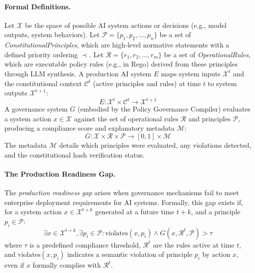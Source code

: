 \documentclass[manuscript,screen,9pt]{acmart}
\begin{document}
\begin{table}[!htb]
\paragraph{Formal Definitions.} Let $\mathcal{X}$ be the space of possible AI system actions or decisions (e.g., model outputs, system behaviors). Let $\mathcal{P} = \{p_1, p_2, \ldots, p_n\}$ be a set of \textit{ConstitutionalPrinciples}, which are high-level normative statements with a defined priority ordering $\prec$. Let $\mathcal{R} = \{r_1, r_2, \ldots, r_m\}$ be a set of \textit{OperationalRules}, which are executable policy rules (e.g., in Rego) derived from these principles through LLM synthesis. A production AI system $E$ maps system inputs $\mathcal{X}^t$ and the constitutional context $\mathcal{C}^t$ (active principles and rules) at time $t$ to system outputs $\mathcal{X}^{t+1}$:
\begin{equation}
E: \mathcal{X}^t \times \mathcal{C}^t \rightarrow \mathcal{X}^{t+1}
\end{equation}
A governance system $G$ (embodied by the Policy Governance Compiler) evaluates a system action $x \in \mathcal{X}$ against the set of operational rules $\mathcal{R}$ and principles $\mathcal{P}$, producing a compliance score and explanatory metadata $\mathcal{M}$:
\begin{equation}
G: \mathcal{X} \times \mathcal{R} \times \mathcal{P} \rightarrow [0,1] \times \mathcal{M}
\end{equation}
The metadata $\mathcal{M}$ details which principles were evaluated, any violations detected, and the constitutional hash verification status.

\paragraph{The Production Readiness Gap.} The \textit{production readiness gap} arises when governance mechanisms fail to meet enterprise deployment requirements for AI systems. Formally, this gap exists if, for a system action $x \in \mathcal{X}^{t+k}$ generated at a future time $t+k$, and a principle $p_i \in \mathcal{P}$:
\[\exists x \in \mathcal{X}^{t+k}, \exists p_i \in \mathcal{P}: \text{violates}(x, p_i) \land G(x, \mathcal{R}^t, \mathcal{P}) > \tau\]
where $\tau$ is a predefined compliance threshold, $\mathcal{R}^t$ are the rules active at time $t$, and $\text{violates}(x, p_i)$ indicates a semantic violation of principle $p_i$ by action $x$, even if $x$ formally complies with $\mathcal{R}^t$.


\end{table}
\end{document}
